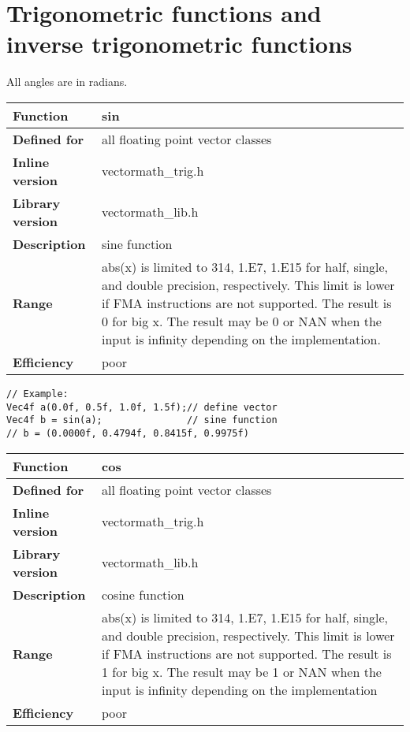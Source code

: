 \documentclass[vcl_manual.tex]{subfiles}
\begin{document}


\section{Trigonometric functions and inverse trigonometric functions}
All angles are in radians.

\begin{tabular}{|p{30mm}|p{120mm}|}
\hline
\bfseries Function & sin \\ \hline
\bfseries Defined for & all floating point vector classes \\ \hline
\bfseries Inline version & vectormath\_trig.h \\ \hline
\bfseries Library version & vectormath\_lib.h \\ \hline
\bfseries Description & sine function \\ \hline
\bfseries Range & abs(x) is limited to 314, 1.E7, 1.E15 for half, single, and double precision, respectively. This limit is lower if FMA instructions are not supported. The result is 0 for big x. The result may be 0 or NAN when the input is infinity depending on the implementation. \\ \hline
\bfseries Efficiency & poor \\ \hline
\end{tabular}
\begin{lstlisting}[frame=none]
// Example:
Vec4f a(0.0f, 0.5f, 1.0f, 1.5f);// define vector
Vec4f b = sin(a);               // sine function
// b = (0.0000f, 0.4794f, 0.8415f, 0.9975f)
\end{lstlisting}


\begin{tabular}{|p{30mm}|p{120mm}|}
\hline
\bfseries Function & cos \\ \hline
\bfseries Defined for & all floating point vector classes \\ \hline
\bfseries Inline version & vectormath\_trig.h \\ \hline
\bfseries Library version & vectormath\_lib.h \\ \hline
\bfseries Description & cosine function \\ \hline
\bfseries Range & abs(x) is limited to 314, 1.E7, 1.E15 for half, single, and double precision, respectively. This limit is lower if FMA instructions are not supported. The result is 1 for big x. The result may be 1 or NAN when the input is infinity depending on the implementation \\ \hline
\bfseries Efficiency & poor \\ \hline
\end{tabular}
\end{document}
